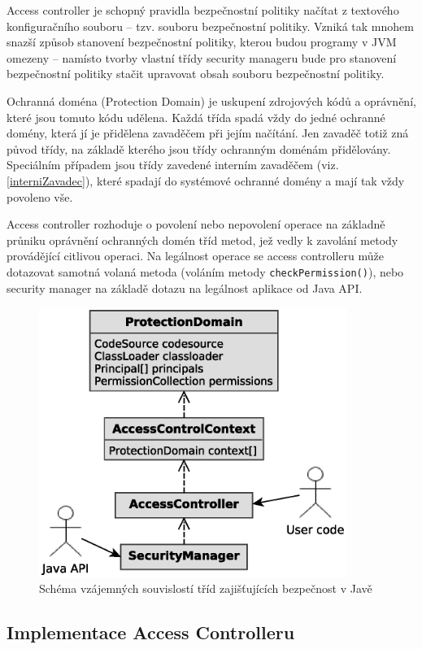 Access controller je schopný pravidla bezpečnostní politiky načítat z textového konfiguračního souboru -- tzv. souboru bezpečnostní politiky. Vzniká tak mnohem snazší způsob stanovení bezpečnostní politiky, kterou budou programy v JVM omezeny -- namísto tvorby vlastní třídy security manageru bude pro stanovení bezpečnostní politiky stačit upravovat obsah souboru bezpečnostní politiky. \cite[5]{oaks}

Ochranná doména (Protection Domain) je uskupení zdrojových kódů a oprávnění, které jsou tomuto kódu udělena. Každá třída spadá vždy do jedné ochranné domény, která jí je přidělena zavaděčem při jejím načítání. Jen zavaděč totiž zná původ třídy, na základě kterého jsou třídy ochranným doménám přidělovány. Speciálním případem jsou třídy zavedené interním zavaděčem (viz. \ref{interniZavadec}), které spadají do systémové ochranné domény a mají tak vždy povoleno vše. \cite[5.4]{oaks}

Access controller rozhoduje o povolení nebo nepovolení operace na základně průniku oprávnění ochranných domén tříd metod, jež vedly k zavolání metody provádějící citlivou operaci. Na legálnost operace se access controlleru může dotazovat samotná volaná metoda (voláním metody {\tt checkPermission()}), nebo security manager na základě dotazu na legálnost aplikace od Java API.

\begin{figure}[ht]
  \centering
  \includegraphics[width=10cm]{fig/security-schema}
  \caption{Schéma vzájemných souvislostí tříd zajišťujících bezpečnost v Javě}
\end{figure}

\subsection{Implementace Access Controlleru}\label{implementaceAC}

